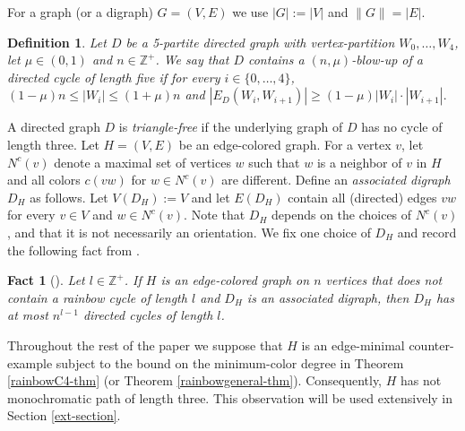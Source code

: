 \documentclass{article}
\newtheorem{defn}[theorem]{Definition}
\newtheorem{fact}[theorem]{Fact}
\begin{document}
For a graph (or a digraph) $G=(V,E)$ we use $|G|:=|V|$ and $\| G\| = |E|$. 

\begin{defn}
Let $D$ be a 5-partite directed graph with vertex-partition $W_0,\dots, W_4$, let $\mu\in (0,1)$ and $n\in \mathbb{Z}^+$. We say that $D$  contains a $(n, \mu)$-blow-up of a directed cycle of length five if for every $i\in \{0,\dots, 4\}$, $(1-\mu)n \leq |W_i|\leq (1+\mu)n$  and $|E_D(W_i, W_{i+1})|\geq (1-\mu)|W_i|\cdot |W_{i+1}|.$  
\end{defn}
A directed graph $D$ is {\it triangle-free} if the underlying graph of $D$ has no cycle of length three. 
Let $H=(V,E)$ be an edge-colored graph. For a vertex $v$, let $N^c(v)$ denote a maximal set of vertices $w$ such that $w$ is a neighbor of $v$ in $H$ and all colors $c(vw)$ for $w\in N^c(v)$ are different. Define an {\it associated digraph $D_H$} as follows. Let $V(D_H):=V$ and let $E(D_H)$ contain all (directed) edges $vw$ for every $v\in V$  and  $w\in N^c(v).$  Note that $D_H$ depends on the choices of $N^c(v)$, and that it is not necessarily an orientation. We fix one choice of $D_H$ and record the following fact from \cite{CMNO-even}. 
\begin{fact}[\cite{CMNO-even}]\label{fact-di-cycles}
Let $l\in \mathbb{Z}^+$. If $H$ is an edge-colored graph on $n$ vertices that does not contain a rainbow cycle of length $l$ and $D_H$ is an associated digraph, then $D_H$ has at most $n^{l-1}$ directed cycles of length $l$.    
\end{fact}
Throughout the rest of the paper we suppose that $H$ is an edge-minimal counter-example subject to the bound on the minimum-color degree in Theorem \ref{rainbowC4-thm} (or Theorem \ref{rainbowgeneral-thm}).
Consequently, $H$ has not monochromatic path of length three. This observation will be used extensively in Section \ref{ext-section}.
\end{document}
